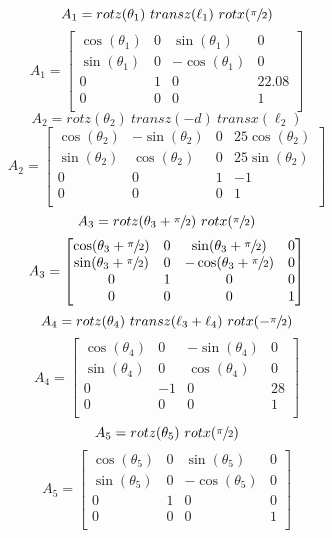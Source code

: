 \documentclass[12pt]{report}
\begin{document}
\[
A_1 = rotz(\theta_1) ~ transz(\ell_1) ~ rotx(\sfrac{\pi}{2})
\]
\vspace{.25ex}
\[
A_1 =
\begin{bmatrix}
  \cos(\theta_1) & 0 & \sin(\theta_1) & 0 \\
  \sin(\theta_1) & 0 & -\cos(\theta_1) & 0 \\
  0 & 1 & 0 & 22.08 \\
  0 & 0 & 0 & 1 \\
\end{bmatrix}
\]
\vspace{.25ex}
\[
A_2 = rotz(\theta_2) ~ transz(-d) ~ transx(\ell_2)
\]
\vspace{.25ex}
\[
A_2 =
\begin{bmatrix}
  \cos(\theta_2) & -\sin(\theta_2) & 0 & 25\cos(\theta_2) \\
  \sin(\theta_2) & \cos(\theta_2) & 0 & 25\sin(\theta_2) \\
  0 & 0 & 1 & -1 \\
  0 & 0 & 0 & 1 \\
\end{bmatrix}
\]
\vspace{.25ex}
\[
A_3 = rotz(\theta_3 + \sfrac{\pi}{2}) ~ rotx(\sfrac{\pi}{2})
\]
\vspace{.25ex}
\[
A_3 =
\begin{bmatrix}
  \cos(\theta_3 +  \sfrac{\pi}{2}) & 0 & \sin(\theta_3 +  \sfrac{\pi}{2}) & 0 \\
  \sin(\theta_3 +  \sfrac{\pi}{2}) & 0 & -\cos(\theta_3 +  \sfrac{\pi}{2}) & 0 \\
  0 & 1 & 0 & 0 \\
  0 & 0 & 0 & 1 \\
\end{bmatrix}
\]
\vspace{.25ex}
\[
A_4 = rotz(\theta_4) ~ transz(\ell_3 + \ell_4) ~ rotx(-\sfrac{\pi}{2})
\]
\vspace{.25ex}
\[
A_4 =
\begin{bmatrix}
  \cos(\theta_4) & 0 & -\sin(\theta_4) & 0 \\
  \sin(\theta_4) & 0 & \cos(\theta_4) & 0 \\
  0 & -1 & 0 & 28 \\
  0 & 0 & 0 & 1 \\
\end{bmatrix}
\]
\vspace{.25ex}
\[
A_5 = rotz(\theta_5) ~ rotx(\sfrac{\pi}{2})
\]
\vspace{.25ex}
\[
A_5 =
\begin{bmatrix}
  \cos(\theta_5) & 0 & \sin(\theta_5) & 0 \\
  \sin(\theta_5) & 0 & -\cos(\theta_5) & 0 \\
  0 & 1 & 0 & 0 \\
  0 & 0 & 0 & 1 \\
\end{bmatrix}
\]
\end{document}
